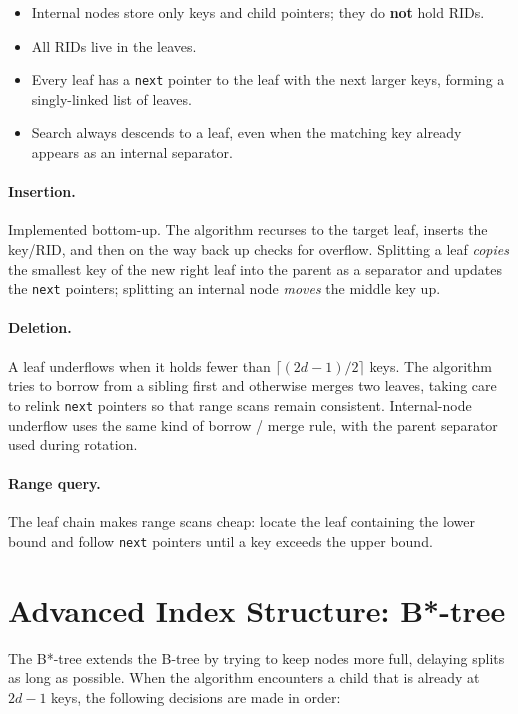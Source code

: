 \documentclass[sigconf]{acmart}
\begin{document}
\begin{itemize}
\item Internal nodes store only keys and child pointers; they do
\textbf{not} hold RIDs.
\item All RIDs live in the leaves.
\item Every leaf has a \texttt{next} pointer to the leaf with the next
larger keys, forming a singly-linked list of leaves.
\item Search always descends to a leaf, even when the matching key
already appears as an internal separator.
\end{itemize}

\paragraph{Insertion.} Implemented bottom-up. The algorithm recurses
to the target leaf, inserts the key/RID, and then on the way back up
checks for overflow. Splitting a leaf \emph{copies} the smallest key
of the new right leaf into the parent as a separator and updates the
\texttt{next} pointers; splitting an internal node \emph{moves} the
middle key up.

\paragraph{Deletion.} A leaf underflows when it holds fewer
than $\lceil(2d-1)/2\rceil$ keys. The algorithm tries to borrow from
a sibling first and otherwise merges two leaves, taking care to relink
\texttt{next} pointers so that range scans remain consistent.
Internal-node underflow uses the same kind of borrow / merge rule,
with the parent separator used during rotation.

\paragraph{Range query.} The leaf chain makes range scans cheap:
locate the leaf containing the lower bound and follow \texttt{next}
pointers until a key exceeds the upper bound.

\section{Advanced Index Structure: B*-tree}

The B*-tree extends the B-tree by trying to keep nodes more full,
delaying splits as long as possible. When the algorithm encounters
a child that is already at $2d-1$ keys, the following decisions are
made in order:
\end{document}
